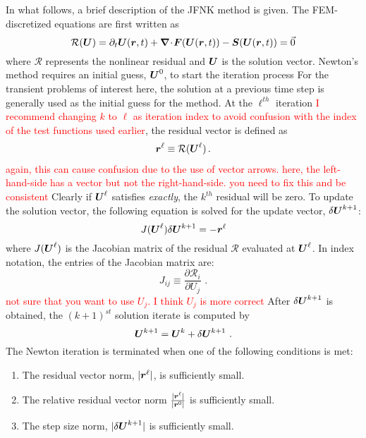 In what follows, a brief description of the JFNK method is given.  The FEM-discretized equations are first written as
\begin{equation}
  \label{eqn:F}
  \mathcal{R} (\boldsymbol U) = \partial_t \boldsymbol U(\boldsymbol r, t) + \boldsymbol{\nabla}\! \cdot \! \boldsymbol F(\boldsymbol U(\boldsymbol r, t)) - \boldsymbol S(\boldsymbol U(\boldsymbol r, t)) = \vec{0}
\end{equation}
where $\mathcal{R}$ represents the nonlinear residual and $\boldsymbol U$
is the solution vector. Newton's method requires an initial guess,
$\boldsymbol U^0$, to start the iteration process For the transient
problems of interest here, the solution at a previous time step is
generally used as the initial guess for the method. At the $\ell^{th}$
iteration \textcolor{red}{I recommend changing $k$ to $\ell$ as iteration index to avoid confusion with the index of the test functions used earlier}, the residual vector is defined as
\begin{align}
  \boldsymbol r^\ell \equiv \mathcal{R} (\boldsymbol U^\ell)\,.
\end{align}
\textcolor{red}{again, this can cause confusion due to the use of vector arrows. here, the left-hand-side has a vector but not the right-hand-side. you need to fix this and be consistent} 
Clearly if $\boldsymbol U^\ell$ satisfies  \emph{exactly}, the
$k^{th}$ residual will be zero.  To update the solution vector, the
following equation is solved for the update vector, $\delta
\boldsymbol U^{k+1}$:
\begin{equation}
  \label{eqn:newton_correction}
J (\boldsymbol U^\ell) \delta \boldsymbol U^{k+1} = - \boldsymbol r^\ell
\end{equation}
where $J(\boldsymbol U^\ell)$ is the Jacobian
matrix of the residual $\mathcal{R}$ evaluated at $\boldsymbol U^\ell$.  In index notation, the entries of the Jacobian matrix are:
\begin{equation}
  \label{eqn:jacobian_matrix}
  J_{ij} \equiv \frac {\partial \mathcal{R}_i} {\partial U_j} \,\,.
\end{equation}
\textcolor{red}{not sure that you want to use $U_j$. I think $U_j$ is more correct}
After $\delta \boldsymbol U^{k+1}$ is obtained, the $(k+1)^{st}$ solution iterate
is computed by
\begin{equation}
  \boldsymbol U^{k+1} = \boldsymbol U^{k} + \delta \boldsymbol U^{k+1} \,\,.
\end{equation}
The Newton iteration is terminated when one of the following conditions is met:
\begin{enumerate}
\item The residual vector norm, $|\boldsymbol r^\ell|$, is sufficiently small.
\item The relative residual vector norm $\frac{|\boldsymbol r^\ell|}{|\boldsymbol r^0|}$  is sufficiently small.
\item The step size norm, $|\delta \boldsymbol U^{k+1}|$ is sufficiently small.
\end{enumerate}

